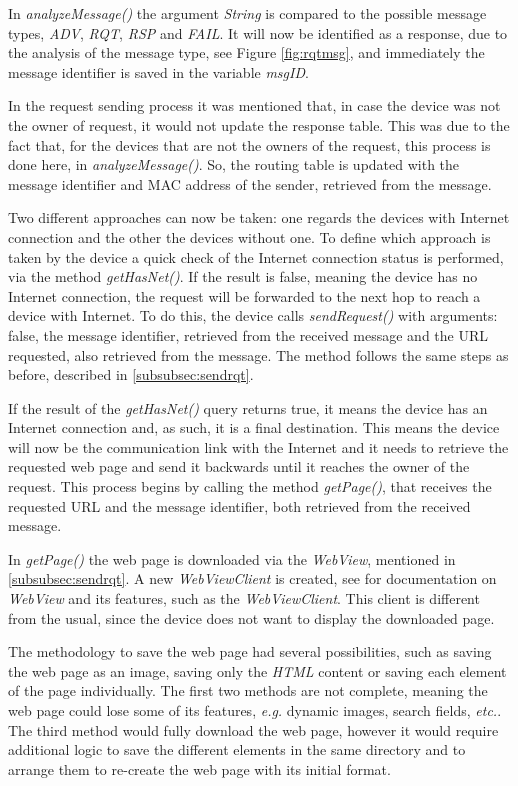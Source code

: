 In \textit{analyzeMessage()} the argument \textit{String} is compared to the possible message types, \textit{ADV}, \textit{RQT}, \textit{RSP} and \textit{FAIL}. It will now be identified as a response, due to the analysis of the message type, see Figure \ref{fig:rqtmsg}, and immediately the message identifier is saved in the variable \textit{msgID}.

In the request sending process it was mentioned that, in case the device was not the owner of request, it would not update the response table. This was due to the fact that, for the devices that are not the owners of the request, this process is done here, in \textit{analyzeMessage()}. So, the routing table is updated with the message identifier and \gls{MAC} address of the sender, retrieved from the message.

Two different approaches can now be taken: one regards the devices with Internet connection and the other the devices without one. To define which approach is taken by the device a quick check of the Internet connection status is performed, via the method \textit{getHasNet()}. If the result is false, meaning the device has no Internet connection, the request will be forwarded to the next hop to reach a device with Internet. To do this, the device calls \textit{sendRequest()} with arguments: false, the message identifier, retrieved from the received message and the \gls{URL} requested, also retrieved from the message. The method follows the same steps as before, described in \ref{subsubsec:sendrqt}.

If the result of the \textit{getHasNet()} query returns true, it means the device has an Internet connection and, as such, it is a final destination. This means the device will now be the communication link with the Internet and it needs to retrieve the requested web page and send it backwards until it reaches the owner of the request. This process begins by calling the method \textit{getPage()}, that receives the requested \gls{URL} and the message identifier, both retrieved from the received message.

In \textit{getPage()} the web page is downloaded via the \textit{WebView}, mentioned in \ref{subsubsec:sendrqt}. A new \textit{WebViewClient} is created, see \cite{webview} for documentation on \textit{WebView} and its features, such as the \textit{WebViewClient}. This client is different from the usual, since the device does not want to display the downloaded page.

The methodology to save the web page had several possibilities, such as saving the web page as an image, saving only the \textit{HTML} content or saving each element of the page individually. The first two methods are not complete, meaning the web page could lose some of its features, \textit{e.g.} dynamic images, search fields, \textit{etc.}. The third method would fully download the web page, however it would require additional logic to save the different elements in the same directory and to arrange them to re-create the web page with its initial format.

